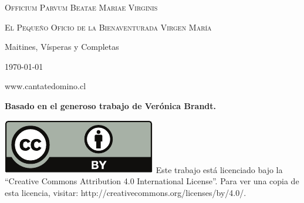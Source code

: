 \documentclass[12pt,a5paper,openright]{memoir}
\begin{document}

\thispagestyle{empty}


\null\vfill
\begin{center}
    \large
    \textsc{Officium Parvum Beatae Mariae Virginis}

    \bigskip

    \huge
    \textsc{\gregorian El Pequeño Oficio de la Bienaventurada Virgen María}

    \bigskip
    \bigskip
    \bigskip


    \normalsize Maitines, Vísperas y Completas


    \footnotesize


\end{center}
\null\vfill

\newpage
\thispagestyle{empty}

\null\vfill
\begin{center}

    \today

    www.cantatedomino.cl

    \bigskip
    \bigskip
    \bigskip
    \bigskip
    \bigskip
    \bigskip

    \footnotesize

    \textbf{Basado en el generoso trabajo de Verónica Brandt. }

    \bigskip
    \bigskip
    \bigskip

    \begin{minipage}{0.6\textwidth}



        \includegraphics[height=0.8\baselineskip]{by.pdf} Este trabajo está licenciado bajo la ``Creative Commons Attribution 4.0 International License''. Para ver una copia de esta licencia, visitar:
        http://creativecommons.org/licenses/by/4.0/.

    \end{minipage}


\end{center}
\null\vfill
\end{document}
